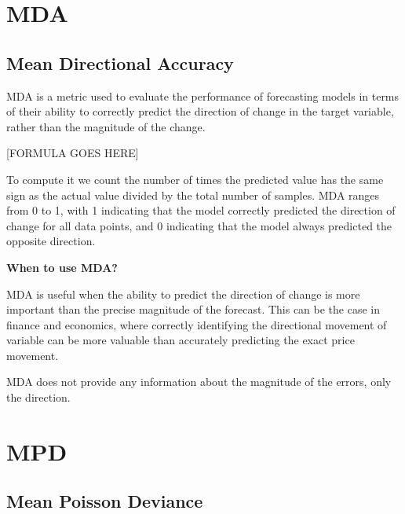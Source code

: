 \clearpage
\thispagestyle{regressionstyle}
\section{MDA}
\subsection{Mean Directional Accuracy}

MDA is a metric used to evaluate the performance of forecasting models in terms of their ability to correctly predict the direction of change in the target variable,
rather than the magnitude of the change.

\begin{center}
    [FORMULA GOES HERE]
\end{center}

To compute it we count the number of times the predicted value has the same sign as the actual value divided by the total number of samples. MDA ranges from 0 to 1, with 1 indicating
that the model correctly predicted the direction of change for all data points, and 0 indicating that the model
always predicted the opposite direction.

\textbf{When to use MDA?}

MDA is useful when the ability to predict the direction of change is more important than the precise magnitude of the forecast. This can be the case in finance and economics,
where correctly identifying the directional movement of variable can be more valuable than accurately predicting the exact price movement.

{
    \item MDA does not provide any information about the magnitude of the errors, only the direction.
}

\clearpage
\thispagestyle{regressionstyle}
\section{MPD}
\subsection{Mean Poisson Deviance}

